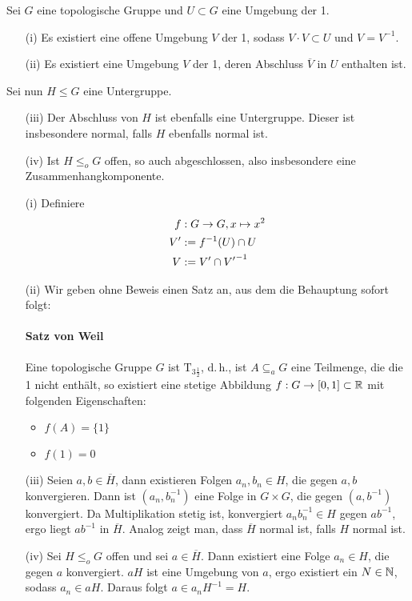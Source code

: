 \documentclass{book}
\renewcommand{\i}{^{-1}}
\begin{document}
\Prop{}
\label{Prop4}
Sei $G$ eine topologische Gruppe und $U \subset G$ eine Umgebung der 1.
\begin{itemize}
\item[(i)] Es existiert eine offene Umgebung $V$ der 1, sodass $V\cdot V \subset U$ und $V = V\i$.
\item[(ii)] Es existiert eine Umgebung $V$ der 1, deren Abschluss $\overline{V}$ in $U$ enthalten ist.
\end{itemize}
Sei nun $H \leq G$ eine Untergruppe.
\begin{itemize}
\item[(iii)] Der Abschluss von $H$ ist ebenfalls eine Untergruppe. Dieser ist insbesondere normal, falls $H$ ebenfalls normal ist.
\item[(iv)] Ist $H \leq_o G$ offen, so auch abgeschlossen, also insbesondere eine Zusammenhangkomponente.
\end{itemize}
\begin{Beweis}{}
\begin{itemize}
\item[(i)] Definiere
\begin{align*}
f&: G \pfeil{} G, x \mapsto x^2\\
V' &:= f\i(U) \cap U\\
V &:= V' \cap {V'}\i
\end{align*}
\item[(ii)] Wir geben ohne Beweis einen Satz an, aus dem die Behauptung sofort folgt:
\paragraph{Satz von Weil}
Eine topologische Gruppe $G$ ist $\text{T}_{3\frac{1}{2}}$, d.\,h., ist $A\subseteq_aG$ eine Teilmenge, die die 1 nicht enthält, so existiert eine stetige Abbildung $f : G \overset{}{\rightarrow} [0,1] \subset \mathbb{R}$ mit folgenden Eigenschaften:
\begin{itemize}
\item $f(A) = \{1\}$
\item $f(1) = 0$
\end{itemize}
\item[(iii)] Seien $a,b \in \overline{H}$, dann existieren Folgen $a_n,b_n \in H$, die gegen $a,b$ konvergieren. Dann ist $(a_n,b_n\i)$ eine Folge in $G\times G$, die gegen $(a,b\i)$ konvergiert. Da Multiplikation stetig ist, konvergiert $a_nb_n\i \in H$ gegen $ab\i$, ergo liegt $ab\i$ in $\overline{H}$. Analog zeigt man, dass $\overline{H}$ normal ist, falls $H$ normal ist.
\item[(iv)] Sei $H \leq_o G$ offen und sei $a \in \overline{H}$. Dann existiert eine Folge $a_n \in H$, die gegen $a$ konvergiert. $aH$ ist eine Umgebung von $a$, ergo existiert ein $N \in \mathbb{N}$, sodass $a_n \in aH$. Daraus folgt $a \in a_nH\i = H$.
\end{itemize}
\end{Beweis}
\end{document}
